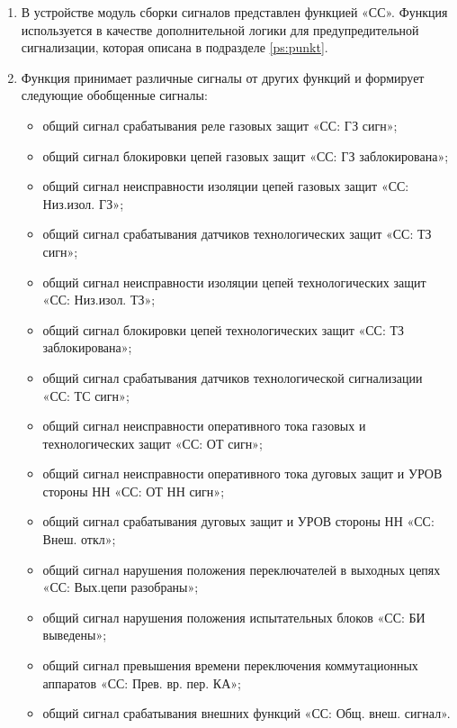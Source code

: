 
\color{black}

\begin{enumerate}
\item
В устройстве модуль сборки сигналов представлен функцией «СС». Функция используется в качестве дополнительной логики для предупредительной сигнализации, которая описана в подразделе \ref{ps:punkt}.

\item
Функция принимает различные сигналы от других функций и формирует следующие обобщенные сигналы:
\begin{itemize}
	\item общий сигнал срабатывания реле газовых защит «СС: ГЗ сигн»;
	\item общий сигнал блокировки цепей газовых защит «СС: ГЗ заблокирована»;
	\item общий сигнал неисправности изоляции цепей газовых защит «СС: Низ.изол. ГЗ»;	
	\item общий сигнал срабатывания датчиков технологических защит «СС: ТЗ сигн»;
	\item общий сигнал неисправности изоляции цепей технологических защит «СС: Низ.изол. ТЗ»;
	\item общий сигнал блокировки цепей технологических защит «СС: ТЗ заблокирована»;	
	\item общий сигнал срабатывания датчиков технологической сигнализации «СС: ТС сигн»;
	\item общий сигнал неисправности оперативного тока газовых и технологических защит «СС: ОТ сигн»;	
	\item общий сигнал неисправности оперативного тока дуговых защит и УРОВ стороны НН «СС: ОТ НН сигн»;
	\item общий сигнал срабатывания дуговых защит и УРОВ стороны НН «СС: Внеш. откл»;
	\item общий сигнал нарушения положения переключателей в выходных цепях  «СС: Вых.цепи разобраны»;
	\item общий сигнал нарушения положения испытательных блоков «СС: БИ выведены»;
	\item общий сигнал превышения времени переключения коммутационных аппаратов «СС: Прев. вр. пер. КА»;
	\item общий сигнал срабатывания внешних функций «СС: Общ. внеш. сигнал».	
\end{itemize}


\end{enumerate}
